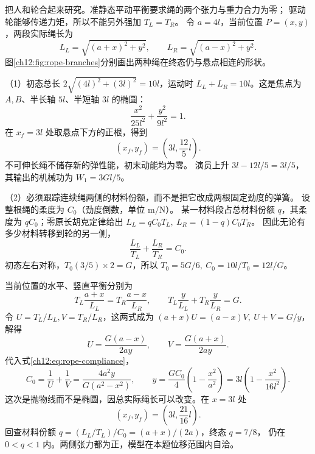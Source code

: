 \begin{xesolution}
把人和轮合起来研究。准静态平动平衡要求绳的两个张力与重力合力为零；
驱动轮能够传递力矩，所以不能另外强加 $T_L=T_R$。
令 $a=4l$，当前位置 $P=(x,y)$，两段实际绳长为
\[
 L_L=\sqrt{(a+x)^2+y^2},\qquad L_R=\sqrt{(a-x)^2+y^2}.
\]
图\ref{ch12:fig:rope-branches}分别画出两种绳在终态仍与悬点相连的形状。

\begin{center}\begin{minipage}{\linewidth}\centering
{}
\label{ch12:fig:rope-branches}
\end{minipage}\end{center}

（1）初态总长 $2\sqrt{(4l)^2+(3l)^2}=10l$，运动时
$L_L+L_R=10l$。这是焦点为 $A,B$、半长轴 $5l$、半短轴 $3l$ 的椭圆：
\[
 \frac{x^2}{25l^2}+\frac{y^2}{9l^2}=1.
\]
在 $x_f=3l$ 处取悬点下方的正根，得到
\[
 \boxed{(x_f,y_f)=\left(3l,\frac{12}{5}l\right)}.
\]
不可伸长绳不储存新的弹性能，初末动能均为零。
演员上升 $3l-12l/5=3l/5$，其输出的机械功为
$\boxed{W_1=3Gl/5}$。

（2）必须跟踪连续绳两侧的材料份额，而不是把它改成两根固定劲度的弹簧。
设整根绳的柔度为 $C_0$（劲度倒数，单位 $\mathrm{m/N}$）。
某一材料段占总材料份额 $q$，其柔度为 $qC_0$；零原长胡克定律给出
$L_L=qC_0T_L,\ L_R=(1-q)C_0T_R$。
因此无论有多少材料转移到轮的另一侧，
\begin{equation}
 \frac{L_L}{T_L}+\frac{L_R}{T_R}=C_0.
 \label{ch12:eq:rope-compliance}
\end{equation}
初态左右对称，$T_0(3/5)\times2=G$，所以
$T_0=5G/6,\ C_0=10l/T_0=12l/G$。

当前位置的水平、竖直平衡分别为
\[
 T_L\frac{a+x}{L_L}=T_R\frac{a-x}{L_R},\qquad
 T_L\frac y{L_L}+T_R\frac y{L_R}=G.
\]
令 $U=T_L/L_L,V=T_R/L_R$，这两式成为
$(a+x)U=(a-x)V,\ U+V=G/y$，解得
\[
 U=\frac{G(a-x)}{2ay},\qquad V=\frac{G(a+x)}{2ay}.
\]
代入式\eqref{ch12:eq:rope-compliance}，
\[
 C_0=\frac1U+\frac1V
 =\frac{4a^2y}{G(a^2-x^2)},\qquad
 y=\frac{GC_0}{4}\left(1-\frac{x^2}{a^2}\right)
 =3l\left(1-\frac{x^2}{16l^2}\right).
\]
这次是抛物线而不是椭圆，因总实际绳长可以改变。在 $x=3l$ 处
\[
 \boxed{(x_f,y_f)=\left(3l,\frac{21}{16}l\right)}.
\]
回查材料份额 $q=(L_L/T_L)/C_0=(a+x)/(2a)$，终态 $q=7/8$，
仍在 $0<q<1$ 内。两侧张力都为正，模型在本题位移范围内自洽。


\end{xesolution}
